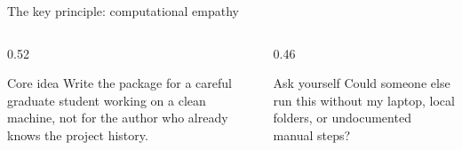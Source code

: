 \documentclass[11.5pt,aspectratio=169]{beamer}
\newcommand{\slsource}[1]{\vspace{0.3em}{\tiny\color{softgray}Source: #1\par}}
\newcommand{\tight}{\setlength{\itemsep}{0.5em}}
\begin{document}
{%

\begin{frame}[t]{The key principle: computational empathy}
\vspace{2pt}
\begin{columns}[T]
\begin{column}{0.52\linewidth}
\begin{block}{Core idea}
\justifying
Write the package for a careful graduate student working on a clean machine, not for the author who already knows the project history.
\end{block}
\end{column}
\begin{column}{0.46\linewidth}
\begin{block}{Ask yourself}
\justifying
Could someone else run this without my laptop, local folders, or undocumented manual steps?
\end{block}
\end{column}
\end{columns}


\end{frame}}
\end{document}
